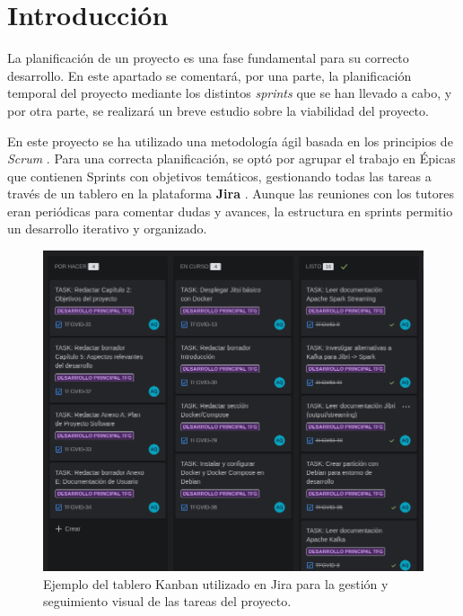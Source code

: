 \label{apendice:plan_proyecto}

\section{Introducción}
\label{sec:plan_intro}

La planificación de un proyecto es una fase fundamental para su correcto desarrollo. En este apartado se comentará, por una parte, la planificación temporal del proyecto mediante los distintos \textit{sprints} que se han llevado a cabo, y por otra parte, se realizará un breve estudio sobre la viabilidad del proyecto.

En este proyecto se ha utilizado una metodología ágil basada en los principios de \textit{Scrum} \cite{trigas2012metodologia}. Para una correcta planificación, se optó por agrupar el trabajo en Épicas que contienen Sprints con objetivos temáticos, gestionando todas las tareas a través de un tablero en la plataforma \textbf{Jira} \cite{atlassian_jira}. Aunque las reuniones con los tutores eran periódicas para comentar dudas y avances, la estructura en sprints permitio un desarrollo iterativo y organizado.

\begin{figure}[H]
    \centering
    \includegraphics[width=\textwidth]{img/jira.png}
    \caption{Ejemplo del tablero Kanban utilizado en Jira para la gestión y seguimiento visual de las tareas del proyecto.}
    \label{fig:anexo_a_jira}
\end{figure}

